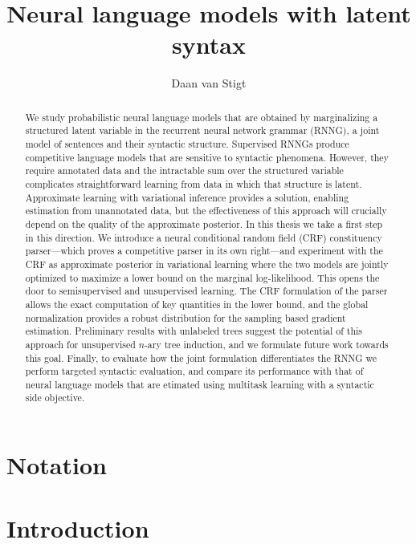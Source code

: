\documentclass{uvamath}
\title{Neural language models with latent syntax}
\author{Daan van Stigt}
\theoremstyle{remark}
\theoremstyle{definition}
\theoremstyle{definition}
\theoremstyle{definition}
\theoremstyle{definition}
\theoremstyle{definition}
\begin{document}
\maketitle


\begin{abstract}
  We study probabilistic neural language models that are obtained by marginalizing a structured latent variable in the recurrent neural network grammar (RNNG), a joint model of sentences and their syntactic structure. Supervised RNNGs produce competitive language models that are sensitive to syntactic phenomena. However, they require annotated data and the intractable sum over the structured variable complicates straightforward learning from data in which that structure is latent. Approximate learning with variational inference provides a solution, enabling estimation from unannotated data, but the effectiveness of this approach will crucially depend on the quality of the approximate posterior. In this thesis we take a first step in this direction. We introduce a neural conditional random field (CRF) constituency parser---which proves a competitive parser in its own right---and experiment with the CRF as approximate posterior in variational learning where the two models are jointly optimized to maximize a lower bound on the marginal log-likelihood. This opens the door to semisupervised and unsupervised learning. The CRF formulation of the parser allows the exact computation of key quantities in the lower bound, and the global normalization provides a robust distribution for the sampling based gradient estimation. Preliminary results with unlabeled trees suggest the potential of this approach for unsupervised $n$-ary tree induction, and we formulate future work towards this goal. Finally, to evaluate how the joint formulation differentiates the RNNG we perform targeted syntactic evaluation, and compare its performance with that of neural language models that are etimated using multitask learning with a syntactic side objective.
\end{abstract}


{\hypersetup{linkcolor=black}
\tableofcontents
}

\chapter*{Notation}



\chapter{Introduction}
\label{01-introduction}

\end{document}

